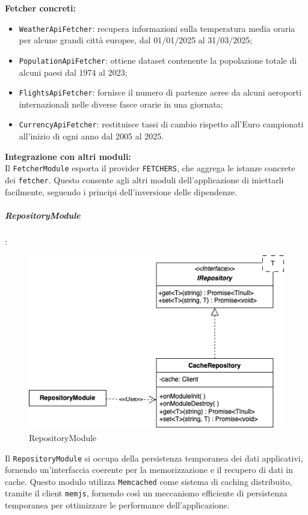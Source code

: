 \textbf{Fetcher concreti:}
\begin{itemize}
    \item \texttt{WeatherApiFetcher}: recupera informazioni sulla temperatura media oraria per alcune grandi città europee, dal 01/01/2025 al 31/03/2025;
    \item \texttt{PopulationApiFetcher}: ottiene dataset contenente la popolazione totale di alcuni paesi dal 1974 al 2023;
    \item \texttt{FlightsApiFetcher}: fornisce il numero di partenze aeree da alcuni aeroporti internazionali nelle diverse fasce orarie in una giornata;
    \item \texttt{CurrencyApiFetcher}: restituisce tassi di cambio rispetto all'Euro campionati all'inizio di ogni anno dal 2005 al 2025.
\end{itemize}

\textbf{Integrazione con altri moduli:} \\
Il \texttt{FetcherModule} esporta il provider \texttt{FETCHERS}, che aggrega le istanze concrete dei \texttt{fetcher}. Questo consente agli altri moduli dell’applicazione di iniettarli facilmente, seguendo i principi dell’inversione delle dipendenze.

\subparagraph{RepositoryModule}:

\begin{figure}[H] 
    \centering
    \includegraphics[scale = 0.5]{template/images/uml_back/RepositoryModule.png}
    \caption{RepositoryModule}
\end{figure}

Il \texttt{RepositoryModule} si occupa della persistenza temporanea dei dati applicativi, fornendo un’interfaccia coerente per la memorizzazione e il recupero di dati in cache. Questo modulo utilizza \texttt{Memcached} come sistema di caching distribuito, tramite il client \texttt{memjs}, fornendo così un meccanismo efficiente di persistenza temporanea per ottimizzare le performance dell'applicazione.\\

